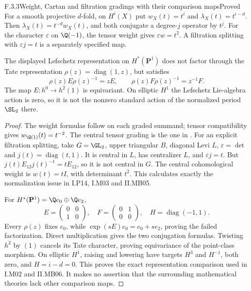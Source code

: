 \begin{result}{F.3.3}{Weight, Cartan and filtration gradings with their comparison maps}{Proved}
For a smooth projective $d$-fold, on $H^i(X)$ put $w_X(t)=t^i$ and $\lambda_X(t)=t^{i-d}$. Then $\lambda_X(t)=t^{-d}w_X(t)$, and both conjugate a degree-$j$ operator by $t^j$. For the character $\varepsilon$ on $\Q(-1)$, the tensor weight gives $\varepsilon w=t^2$. A filtration splitting with $\varepsilon j=t$ is a separately specified map.

The displayed Lefschetz representation on $H^*(\mathbf P^1)$ does not factor through the Tate representation $\rho(z)=\operatorname{diag}(1,z)$, but satisfies
\[
 \rho(z)E\rho(z)^{-1}=zE,\qquad
 \rho(z)F\rho(z)^{-1}=z^{-1}F.
\]
The map $E:h^0\to h^2(1)$ is equivariant. On elliptic $H^1$ the Lefschetz Lie-algebra action is zero, so it is not the nonzero standard action of the normalized period $\SL_2$ there.
\end{result}
\begin{proof}
The weight formulas follow on each graded summand; tensor compatibility gives $w_{\Q(1)}(t)=t^{-2}$. The central tensor grading is the one in \cite[Definition 5.1]{DM1982}. For an explicit filtration splitting, take $G=\GL_2$, upper triangular $B$, diagonal Levi $L$, $\varepsilon=\det$ and $j(t)=\operatorname{diag}(t,1)$. It is central in $L$, has centralizer $L$, and $\varepsilon j=t$. But $j(t)E_{12}j(t)^{-1}=tE_{12}$, so it is not central in $G$. The central cohomological weight is $w(t)=tI$, with determinant $t^2$. This calculates exactly the normalization issue in I.P14, I.M03 and II.MB05.

For $H^*(\mathbf P^1)=\Q e_0\oplus\Q e_2$,
\[
 E=\begin{pmatrix}0&0\\1&0\end{pmatrix},\quad
 F=\begin{pmatrix}0&1\\0&0\end{pmatrix},\quad
 H=\operatorname{diag}(-1,1).
\]
Every $\rho(z)$ fixes $e_0$, while $\exp(sE)e_0=e_0+se_2$, proving the failed factorization. Direct multiplication gives the two conjugation formulas. Twisting $h^2$ by $(1)$ cancels its Tate character, proving equivariance of the point-class morphism. On elliptic $H^1$, raising and lowering have targets $H^3$ and $H^{-1}$, both zero, and $H=i-d=0$. This proves the exact representation comparison used in I.M02 and II.MB06. It makes no assertion that the surrounding mathematical theories lack other comparison maps.
\end{proof}

